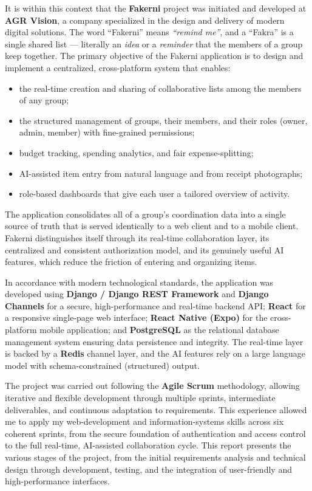\documentclass[12pt,a4paper,oneside]{report}
\newcommand{\myCompany}{AGR Vision}
\begin{document}
It is within this context that the \textbf{Fakerni} project was initiated and
developed at \textbf{\myCompany}, a company specialized in the design and delivery
of modern digital solutions. The word ``Fakerni'' means \emph{``remind me''}, and
a ``Fakra'' is a single shared list --- literally an \emph{idea} or a
\emph{reminder} that the members of a group keep together. The primary objective
of the Fakerni application is to design and implement a centralized,
cross-platform system that enables:

\begin{itemize}[nosep]
  \item the real-time creation and sharing of collaborative lists among the
        members of any group;
  \item the structured management of groups, their members, and their roles
        (owner, admin, member) with fine-grained permissions;
  \item budget tracking, spending analytics, and fair expense-splitting;
  \item AI-assisted item entry from natural language and from receipt photographs;
  \item role-based dashboards that give each user a tailored overview of activity.
\end{itemize}

The application consolidates all of a group's coordination data into a single
source of truth that is served identically to a web client and to a mobile
client. Fakerni distinguishes itself through its real-time collaboration layer,
its centralized and consistent authorization model, and its genuinely useful AI
features, which reduce the friction of entering and organizing items.

In accordance with modern technological standards, the application was developed
using \textbf{Django / Django REST Framework} and \textbf{Django Channels} for a
secure, high-performance and real-time backend API; \textbf{React} for a
responsive single-page web interface; \textbf{React Native (Expo)} for the
cross-platform mobile application; and \textbf{PostgreSQL} as the relational
database management system ensuring data persistence and integrity. The real-time
layer is backed by a \textbf{Redis} channel layer, and the AI features rely on a
large language model with schema-constrained (structured) output.

The project was carried out following the \textbf{Agile Scrum} methodology,
allowing iterative and flexible development through multiple sprints, intermediate
deliverables, and continuous adaptation to requirements. This experience allowed
me to apply my web-development and information-systems skills across six coherent
sprints, from the secure foundation of authentication and access control to the
full real-time, AI-assisted collaboration cycle. This report presents the various
stages of the project, from the initial requirements analysis and technical design
through development, testing, and the integration of user-friendly and
high-performance interfaces.
\end{document}
